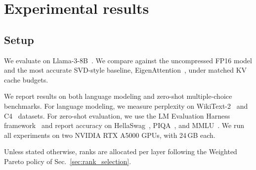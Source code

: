 \section{Experimental results}

\subsection{Setup}
\label{sec:experiments}

We evaluate \methodname on Llama-3-8B~\cite{grattafiori2024llama3herdmodels}.
We compare against the uncompressed FP16 model and the most accurate SVD-style baseline, EigenAttention~\cite{saxena2024eigenattention}, under matched KV cache budgets.

We report results on both language modeling and zero-shot multiple-choice benchmarks.
For language modeling, we measure perplexity on WikiText-2~\cite{wikitext} and C4~\cite{c4} datasets.
For zero-shot evaluation, we use the LM Evaluation Harness framework~\cite{eval-harness} and report accuracy on HellaSwag~\cite{hellaswag}, PIQA~\cite{piqa}, and MMLU~\cite{mmlu1, mmlu2}. We run all experiments on two NVIDIA RTX A5000 GPUs, with 24\,GB each.


Unless stated otherwise, ranks are allocated per layer %
following the Weighted Pareto policy of Sec.~\ref{sec:rank_selection}.

